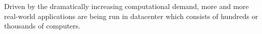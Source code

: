 
{}

Driven by the dramatically increasing computational demand, more and more 
real-world applications are being run in datacenter which consists of hundreds 
or thousands of computers.








